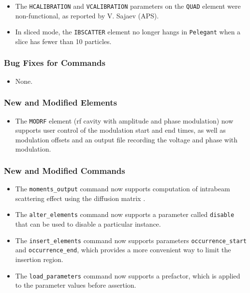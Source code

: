 \documentclass[11pt]{article}
\begin{document}
\begin{itemize}
\item The \verb|HCALIBRATION| and \verb|VCALIBRATION| parameters on the \verb|QUAD| element were non-functional,
  as reported by V. Sajaev (APS).
\item In sliced mode, the \verb|IBSCATTER| element no longer hangs in \verb|Pelegant| when a slice has fewer than
  10 particles.
\end{itemize}

\subsubsection{Bug Fixes for Commands}
\begin{itemize}
\item None.
\end{itemize}

\subsubsection{New and Modified Elements}
\begin{itemize}
\item The \verb|MODRF| element (rf cavity with amplitude and phase modulation) now supports user control of the
  modulation start and end times, as well as modulation offsets and an output file recording the voltage and
  phase with modulation.
\end{itemize}

\subsubsection{New and Modified Commands}
\begin{itemize}
\item The \verb|moments_output| command now supports computation of intrabeam scattering effect using
  the diffusion matrix \cite{KuboOide}.
\item The \verb|alter_elements| command now supports a parameter called \verb|disable| that can be used to
  disable a particular instance.
\item The \verb|insert_elements| command now supports parameters \verb|occurrence_start| and \verb|occurrence_end|,
  which provides a more convenient way to limit the insertion region.
\item The \verb|load_parameters| command now supports a prefactor, which is applied to the parameter values before
  assertion.
\end{itemize}
\end{document}
